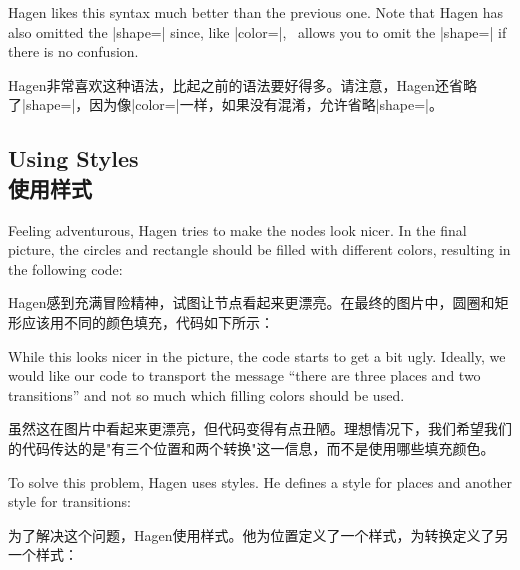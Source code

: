 Hagen likes this syntax much better than the previous one. Note that Hagen has
also omitted the |shape=| since, like |color=|, \tikzname\ allows you to omit
the |shape=| if there is no confusion.


Hagen非常喜欢这种语法，比起之前的语法要好得多。请注意，Hagen还省略了|shape=|，因为像|color=|一样，如果没有混淆，\tikzname 允许省略|shape=|。



\subsection{Using Styles\\使用样式}

Feeling adventurous, Hagen tries to make the nodes look nicer. In the final
picture, the circles and rectangle should be filled with different colors,
resulting in the following code:

Hagen感到充满冒险精神，试图让节点看起来更漂亮。在最终的图片中，圆圈和矩形应该用不同的颜色填充，代码如下所示：

%
\begin{codeexample}[]
\end{codeexample}

While this looks nicer in the picture, the code starts to get a bit ugly.
Ideally, we would like our code to transport the message ``there are three
places and two transitions'' and not so much which filling colors should be
used.

虽然这在图片中看起来更漂亮，但代码变得有点丑陋。理想情况下，我们希望我们的代码传达的是"有三个位置和两个转换"这一信息，而不是使用哪些填充颜色。

To solve this problem, Hagen uses styles. He defines a style for places and
another style for transitions:

为了解决这个问题，Hagen使用样式。他为位置定义了一个样式，为转换定义了另一个样式：

%
\begin{codeexample}[]
\end{codeexample}


